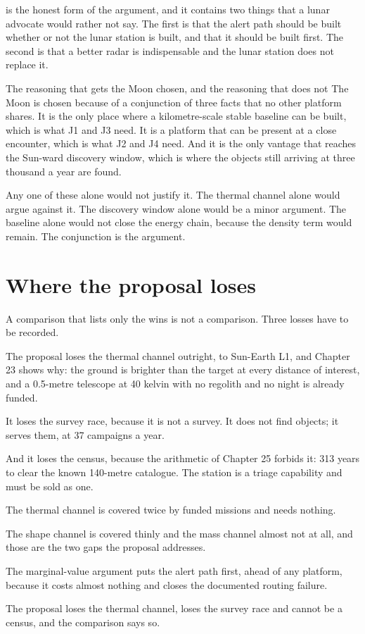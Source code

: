  is the honest form of the argument, and it contains
two things that a lunar advocate would rather not say. The first is that the
alert path should be built whether or not the lunar station is built, and
that it should be built first. The second is that a better radar is
indispensable and the lunar station does not replace it.

\begin{seamnote}{The reasoning that gets the Moon chosen, and the reasoning
that does not}
The Moon is chosen because of a conjunction of three facts that no other
platform shares. It is the only place where a kilometre-scale stable
baseline can be built, which is what J1 and J3 need. It is a platform that
can be present at a close encounter, which is what J2 and J4 need. And it is
the only vantage that reaches the Sun-ward discovery window, which is where
the objects still arriving at three thousand a year are found.

Any one of these alone would not justify it. The thermal channel alone would
argue against it. The discovery window alone would be a minor argument. The
baseline alone would not close the energy chain, because the density term
would remain. The conjunction is the argument.
\end{seamnote}

\section{Where the proposal loses}

A comparison that lists only the wins is not a comparison. Three losses have
to be recorded.

The proposal loses the thermal channel outright, to Sun-Earth L1, and
Chapter 23 shows why: the ground is brighter than the target at every
distance of interest, and a 0.5-metre telescope at 40 kelvin with no regolith
and no night is already funded.

It loses the survey race, because it is not a survey. It does not find
objects; it serves them, at 37 campaigns a year.

And it loses the census, because the arithmetic of Chapter 25 forbids it:
313 years to clear the known 140-metre catalogue. The station is a triage
capability and must be sold as one.

\begin{keytakeaways}
\item The thermal channel is covered twice by funded missions and needs
nothing.
\item The shape channel is covered thinly and the mass channel almost not at
all, and those are the two gaps the proposal addresses.
\item The marginal-value argument puts the alert path first, ahead of any
platform, because it costs almost nothing and closes the documented
routing failure.
\item The proposal loses the thermal channel, loses the survey race and
cannot be a census, and the comparison says so.
\end{keytakeaways}

